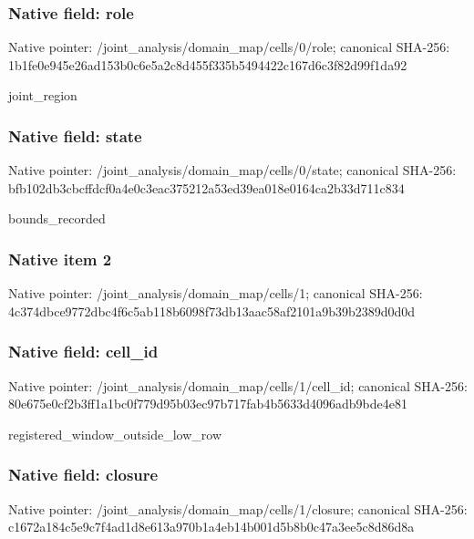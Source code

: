 \documentclass[10pt,a4paper]{article}
\begin{document}
\subsubsection{Native field: role}
Native pointer: /joint\_\allowbreak{}analysis/domain\_\allowbreak{}map/cells/0/role; canonical SHA-256: 1b1fe0e945e26ad153b0c6e5a2c8d455f335b5494422c167d6c3f82d99f1da92

\begingroup\raggedright\sloppy joint\_\allowbreak{}region\par\endgroup

\subsubsection{Native field: state}
Native pointer: /joint\_\allowbreak{}analysis/domain\_\allowbreak{}map/cells/0/state; canonical SHA-256: bfb102db3cbcffdcf0a4e0c3eac375212a53ed39ea018e0164ca2b33d711c834

\begingroup\raggedright\sloppy bounds\_\allowbreak{}recorded\par\endgroup

\subsubsection{Native item 2}
Native pointer: /joint\_\allowbreak{}analysis/domain\_\allowbreak{}map/cells/1; canonical SHA-256: 4c374dbce9772dbc4f6c5ab118b6098f73db13aac58af2101a9b39b2389d0d0d

\subsubsection{Native field: cell\_\allowbreak{}id}
Native pointer: /joint\_\allowbreak{}analysis/domain\_\allowbreak{}map/cells/1/cell\_\allowbreak{}id; canonical SHA-256: 80e675e0cf2b3ff1a1bc0f779d95b03ec97b717fab4b5633d4096adb9bde4e81

\begingroup\raggedright\sloppy registered\_\allowbreak{}window\_\allowbreak{}outside\_\allowbreak{}low\_\allowbreak{}row\par\endgroup

\subsubsection{Native field: closure}
Native pointer: /joint\_\allowbreak{}analysis/domain\_\allowbreak{}map/cells/1/closure; canonical SHA-256: c1672a184c5e9c7f4ad1d8e613a970b1a4eb14b001d5b8b0c47a3ee5c8d86d8a
\end{document}

